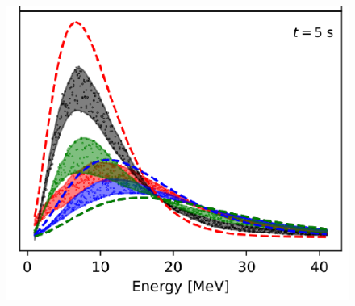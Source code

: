 \documentclass[10pt]{beamer}
\begin{document}
\begin{frame}
\begin{minipage}{0.45\textwidth}
\begin{figure}[hbt!]
            \includegraphics[width=\textwidth]{fig/9_2.pdf}
        \end{figure}
    \end{minipage}
\end{frame}
\end{document}
